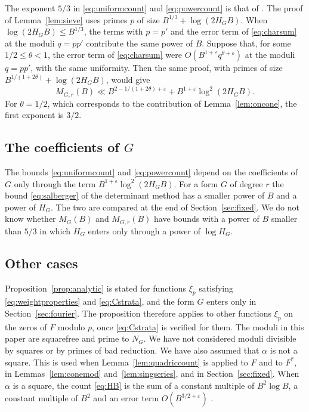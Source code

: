 \documentclass[11pt]{amsart}
\numberwithin{equation}{section}
\numberwithin{figure}{section}
\theoremstyle{definition}
\newcommand{\eps}{\varepsilon}
\begin{document}
The exponent $5/3$ in \eqref{eq:uniformcount} and
\eqref{eq:powercount} is that of \cite[Theorem~1.3]{M}. The proof
of Lemma~\ref{lem:sieve} uses primes $p$ of size
$B^{1/3}+\log(2H_GB)$. When $\log(2H_GB)\le B^{1/3}$, the terms with
$p=p'$ and the error term of \eqref{eq:charsum} at the moduli $q=pp'$
contribute the same power of $B$. Suppose that, for some
$1/2\le\theta<1$, the error term of \eqref{eq:charsum} were
$O(B^{1+\eps}q^{\theta+\eps})$ at the moduli $q=pp'$, with the same
uniformity. Then the same proof, with primes of size
$B^{1/(1+2\theta)}+\log(2H_GB)$, would give
\[
 M_{G,r}(B)\ll B^{2-1/(1+2\theta)+\eps}+B^{1+\eps}\log^2(2H_GB).
\]
For $\theta=1/2$, which corresponds to the contribution of
Lemma~\ref{lem:oncone}, the first exponent is $3/2$.

\subsection{The coefficients of \texorpdfstring{$G$}{G}}\label{sec:conclusion-coefficients}

The bounds \eqref{eq:uniformcount} and \eqref{eq:powercount} depend
on the coefficients of $G$ only through the term
$B^{1+\eps}\log^2(2H_GB)$. For a form $G$ of degree $r$ the bound
\eqref{eq:salberger} of the determinant method has a smaller power of
$B$ and a power of $H_G$. The two are compared at the end of
Section~\ref{sec:fixed}. We do not know whether $M_G(B)$ and
$M_{G,r}(B)$ have bounds with a power of $B$ smaller than $5/3$ in
which $H_G$ enters only through a power of $\log H_G$.

\subsection{Other cases}\label{sec:conclusion-cases}

Proposition~\ref{prop:analytic} is stated for functions $\xi_p$
satisfying \eqref{eq:weightproperties} and \eqref{eq:Cstrata}, and
the form $G$ enters only in Section~\ref{sec:fourier}. The
proposition therefore applies to other functions $\xi_p$ on the zeros
of $F$ modulo $p$, once \eqref{eq:Cstrata} is verified for them. The moduli
in this paper are squarefree and prime to $N_G$. We have not
considered moduli divisible by squares or by primes of bad reduction.
We have also assumed that $\alpha$ is not a square. This is used
when Lemma~\ref{lem:quadriccount} is applied to $F$ and to $F^*$, in
Lemmas~\ref{lem:conemod} and~\ref{lem:singseries}, and in
Section~\ref{sec:fixed}. When $\alpha$ is a square, the count
\eqref{eq:HB} is the sum of a constant multiple of $B^2\log B$, a
constant multiple of $B^2$ and an error term $O(B^{3/2+\eps})$
\cite[Theorem~7]{HB}.
\end{document}
